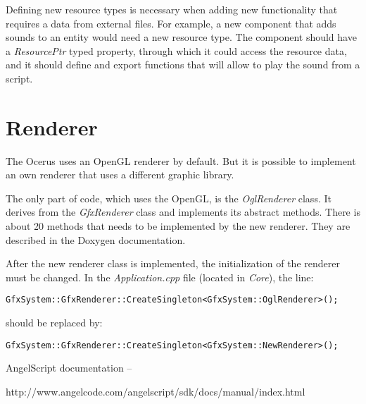 \documentclass[a4paper, 12pt]{report}
\begin{document}
Defining new resource types is necessary when adding new functionality that requires a data from external files. For example, a new component that adds sounds to an entity would need a new resource type. The component should have a \emph{ResourcePtr} typed property, through which it could access the resource data, and it should define and export functions that will allow to play the sound from a script.

\chapter{Renderer}

The Ocerus uses an OpenGL renderer by default. But it is possible to implement an own renderer that uses a different graphic library.

The only part of code, which uses the OpenGL, is the \emph{OglRenderer} class. It derives from the \emph{GfxRenderer} class and implements its abstract methods. There is about 20 methods that needs to be implemented by the new renderer. They are described in the Doxygen documentation.

After the new renderer class is implemented, the initialization of the renderer must be changed. In the \emph{Application.cpp} file (located in \emph{Core}), the line:

\begin{verbatim}
GfxSystem::GfxRenderer::CreateSingleton<GfxSystem::OglRenderer>();
\end{verbatim}
\normalsize

should be replaced by:

\begin{verbatim}
GfxSystem::GfxRenderer::CreateSingleton<GfxSystem::NewRenderer>();
\end{verbatim}
\normalsize


\begin{thebibliography}{9}
AngelScript documentation -- 

http://www.angelcode.com/angelscript/sdk/docs/manual/index.html

\end{thebibliography}

\clearpage
{}
\listoffigures

\clearpage
{}
\listoftables
\end{document}
